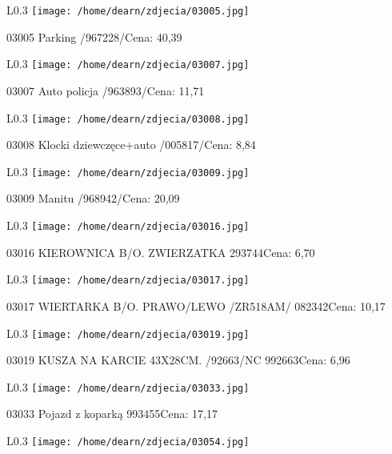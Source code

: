 \begin{wrapfigure}{L}{0.3\textwidth}
\texttt{[image: /home/dearn/zdjecia/03005.jpg]}
\end{wrapfigure}
03005 Parking /967228/Cena: 40,39\newline
\begin{wrapfigure}{L}{0.3\textwidth}
\texttt{[image: /home/dearn/zdjecia/03007.jpg]}
\end{wrapfigure}
03007 Auto policja /963893/Cena: 11,71\newline
\begin{wrapfigure}{L}{0.3\textwidth}
\texttt{[image: /home/dearn/zdjecia/03008.jpg]}
\end{wrapfigure}
03008 Klocki dziewczęce+auto /005817/Cena: 8,84\newline
\begin{wrapfigure}{L}{0.3\textwidth}
\texttt{[image: /home/dearn/zdjecia/03009.jpg]}
\end{wrapfigure}
03009 Manitu /968942/Cena: 20,09\newline
\begin{wrapfigure}{L}{0.3\textwidth}
\texttt{[image: /home/dearn/zdjecia/03016.jpg]}
\end{wrapfigure}
03016 KIEROWNICA B/O. ZWIERZATKA                      293744Cena: 6,70\newline
\begin{wrapfigure}{L}{0.3\textwidth}
\texttt{[image: /home/dearn/zdjecia/03017.jpg]}
\end{wrapfigure}
03017 WIERTARKA B/O. PRAWO/LEWO /ZR518AM/             082342Cena: 10,17\newline
\begin{wrapfigure}{L}{0.3\textwidth}
\texttt{[image: /home/dearn/zdjecia/03019.jpg]}
\end{wrapfigure}
03019 KUSZA NA KARCIE 43X28CM. /92663/NC              992663Cena: 6,96\newline
\begin{wrapfigure}{L}{0.3\textwidth}
\texttt{[image: /home/dearn/zdjecia/03033.jpg]}
\end{wrapfigure}
03033 Pojazd z koparką 993455Cena: 17,17\newline
\begin{wrapfigure}{L}{0.3\textwidth}
\texttt{[image: /home/dearn/zdjecia/03054.jpg]}
\end{wrapfigure}
